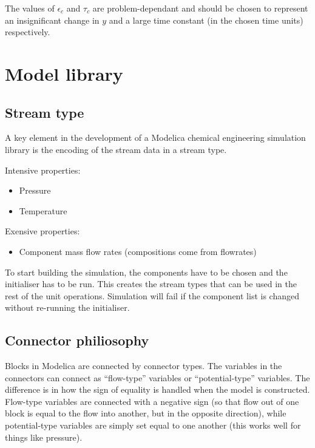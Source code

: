 The values of $\epsilon_c$ and $\tau_c$ are problem-dependant and should be chosen to represent an insignificant change in $y$ and a large time constant (in the chosen time units) respectively.

\section{Model library}
\subsection{Stream type}
A key element in the development of a Modelica chemical engineering simulation library is the encoding of the stream data in a stream type.  


Intensive properties:
\begin{itemize}
  \item Pressure
  \item Temperature
\end{itemize}

Exensive properties:
\begin{itemize}
  \item Component mass flow rates (compositions come from flowrates)
\end{itemize}

To start building the simulation, the components have to be chosen and the initialiser has to be run.  
This creates the stream types that can be used in the rest of the unit operations.  
Simulation will fail if the component list is changed without re-running the initialiser.	

\subsection{Connector philiosophy}
Blocks in Modelica are connected by connector types.  
The variables in the connectors can connect as ``flow-type'' variables or ``potential-type'' variables.  
The difference is in how the sign of equality is handled when the model is constructed.  
Flow-type variables are connected with a negative sign (so that flow out of one block is equal to the flow into another, but in the opposite direction), while potential-type variables are simply set equal to one another (this works well for things like pressure).

